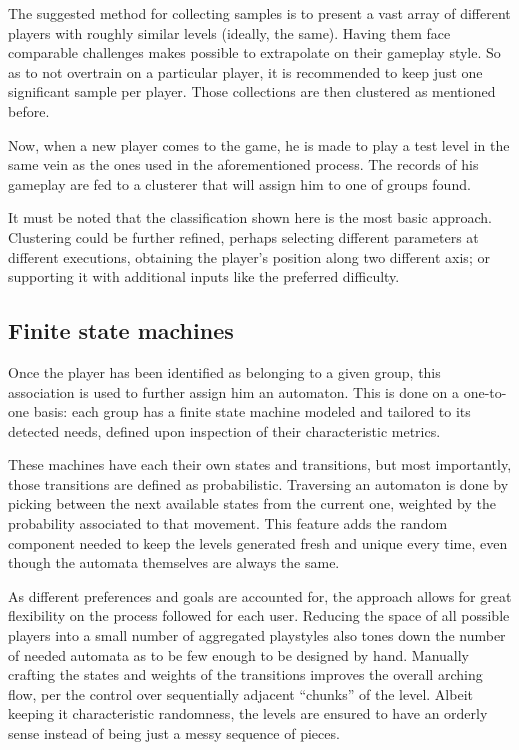 \documentclass[conference]{IEEEtran}
\begin{document}
The suggested method for collecting samples is to present a vast array of different players with roughly similar levels (ideally, the same). Having them face comparable challenges makes possible to extrapolate on their gameplay style. So as to not overtrain on a particular player, it is recommended to keep just one significant sample per player. Those collections are then clustered as mentioned before.

Now, when a new player comes to the game, he is made to play a test level in the same vein as the ones used in the aforementioned process. The records of his gameplay are fed to a clusterer that will assign him to one of groups found.

It must be noted that the classification shown here is the most basic approach. Clustering could be further refined, perhaps selecting different parameters at different executions, obtaining the player's position along two different axis; or supporting it with additional inputs like the preferred difficulty.

\subsection{Finite state machines}

Once the player has been identified as belonging to a given group, this association is used to further assign him an automaton. This is done on a one-to-one basis: each group has a finite state machine modeled and tailored to its detected needs, defined upon inspection of their characteristic metrics.

These machines have each their own states and transitions, but most importantly, those transitions are defined as probabilistic. Traversing an automaton is done by picking between the next available states from the current one, weighted by the probability associated to that movement. This feature adds the random component needed to keep the levels generated fresh and unique every time, even though the automata themselves are always the same.

As different preferences and goals are accounted for, the approach allows for great flexibility on the process followed for each user. Reducing the space of all possible players into a small number of aggregated playstyles also tones down the number of needed automata as to be few enough to be designed by hand. Manually crafting the states and weights of the transitions improves the overall arching flow, per the control over sequentially adjacent ``chunks'' of the level. Albeit keeping it characteristic randomness, the levels are ensured to have an orderly sense instead of being just a messy sequence of pieces.
\end{document}
